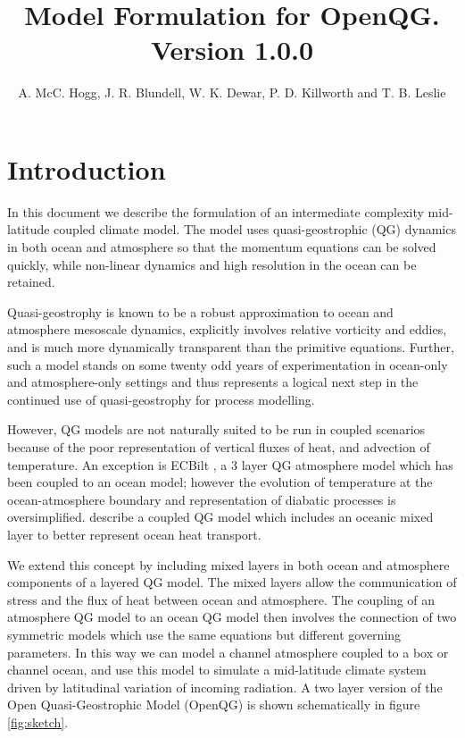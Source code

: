 \documentclass[11pt, a4paper,twoside]{article}
\numberwithin{equation}{section}
\begin{document}
\title{Model Formulation for OpenQG.\\ Version 1.0.0}%
\author{A. McC. Hogg, J. R. Blundell, W. K. Dewar, P. D. Killworth and T. B. Leslie}

\maketitle

\begin{multicols}{2}
{\small \tableofcontents}
\end{multicols}

\newpage
\section{Introduction}
In this document we describe the formulation of an intermediate complexity mid-latitude coupled climate model.
The model uses quasi-geostrophic (QG) dynamics in both ocean and atmosphere so that the momentum equations can be solved quickly, while non-linear dynamics and high resolution in the ocean can be retained.

Quasi-geostrophy is known to be a robust approximation to ocean and atmosphere mesoscale dynamics, explicitly involves relative vorticity and eddies, and is much more dynamically transparent than the primitive equations.
Further, such a model stands on some twenty odd years of experimentation in ocean-only and atmosphere-only settings and thus represents a logical next step in the continued use of quasi-geostrophy for process modelling.

However, QG models are not naturally suited to be run in coupled scenarios because of the poor representation of vertical fluxes of heat, and advection of temperature.
An exception is ECBilt \citep{opsteegh:98}, a 3 layer QG atmosphere model which has been coupled to an ocean model; however the evolution of temperature at the ocean-atmosphere boundary and representation of diabatic processes is oversimplified.
\citet{kravtsov:02} describe a coupled QG model  which includes an oceanic mixed layer to better represent ocean heat transport.

We extend this concept by including mixed layers in both ocean and atmosphere components of a layered QG model.
The mixed layers allow the communication of stress and the flux of heat between ocean and atmosphere.
The coupling of an atmosphere QG model to an ocean QG model then involves the connection of two symmetric models which use the same equations but different governing parameters.
In this way we can model a channel atmosphere coupled to a box or channel ocean, and use this model to simulate a mid-latitude climate system driven by latitudinal variation of incoming radiation.
A two layer version of the Open Quasi-Geostrophic Model (OpenQG) is shown schematically in figure \ref{fig:sketch}.
\end{document}
